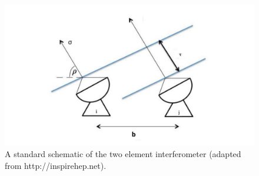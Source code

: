 \begin{figure}[]
\begin{center}
\includegraphics[width=1.\textwidth]{Bernardi/2_element_interferometer_1}
\end{center}
\caption{A standard schematic of the two element interferometer (adapted from http://inspirehep.net).}
\label{fig:fig1}
\end{figure}

